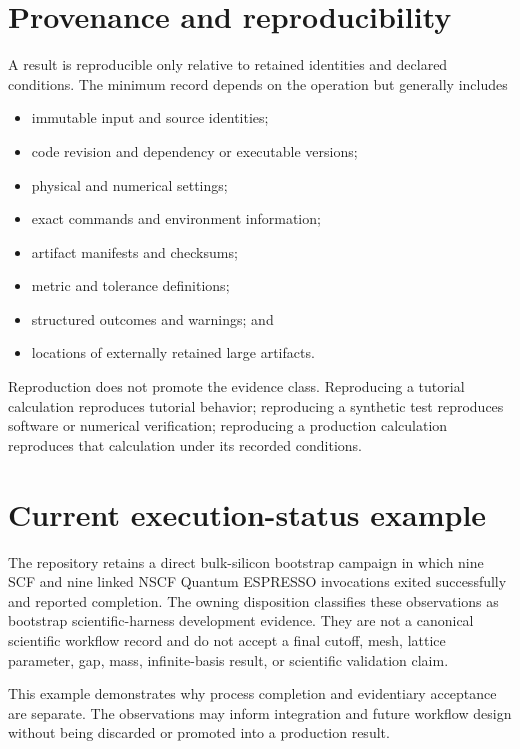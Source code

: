 \section{Provenance and reproducibility}

A result is reproducible only relative to retained identities and declared
conditions. The minimum record depends on the operation but generally includes

\begin{itemize}
  \item immutable input and source identities;
  \item code revision and dependency or executable versions;
  \item physical and numerical settings;
  \item exact commands and environment information;
  \item artifact manifests and checksums;
  \item metric and tolerance definitions;
  \item structured outcomes and warnings; and
  \item locations of externally retained large artifacts.
\end{itemize}

Reproduction does not promote the evidence class. Reproducing a tutorial
calculation reproduces tutorial behavior; reproducing a synthetic test
reproduces software or numerical verification; reproducing a production
calculation reproduces that calculation under its recorded conditions.

\section{Current execution-status example}

The repository retains a direct bulk-silicon bootstrap campaign in which nine
SCF and nine linked NSCF Quantum ESPRESSO invocations exited successfully and
reported completion. The owning disposition classifies these observations as
bootstrap scientific-harness development evidence. They are not a canonical
scientific workflow record and do not accept a final cutoff, mesh, lattice
parameter, gap, mass, infinite-basis result, or scientific validation claim.

This example demonstrates why process completion and evidentiary acceptance are
separate. The observations may inform integration and future workflow design
without being discarded or promoted into a production result.

